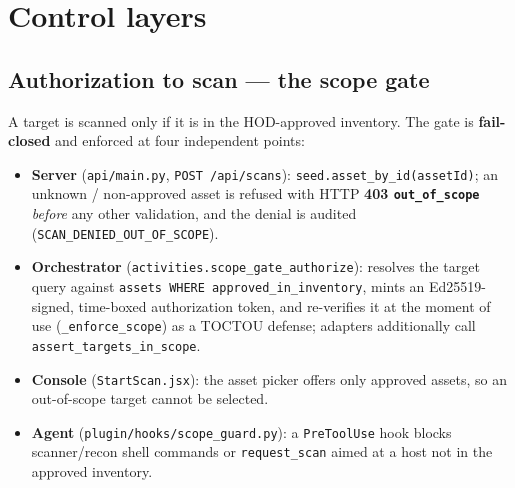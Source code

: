 \documentclass[11pt,a4paper]{article}
\newcommand{\code}[1]{\texttt{#1}}
\newcommand{\boundary}[1]{\textcolor{NavyBlue!80!black}{\textbf{#1}}}
\begin{document}
\section{Control layers}

\subsection{Authorization to scan --- the scope gate}
A target is scanned only if it is in the HOD-approved inventory. The gate is
\textbf{fail-closed} and enforced at four independent points:
\begin{itemize}
  \item \boundary{Server} (\code{api/main.py}, \code{POST /api/scans}):
        \code{seed.asset\_by\_id(assetId)}; an unknown / non-approved asset is
        refused with HTTP \textbf{403 \code{out\_of\_scope}} \emph{before} any
        other validation, and the denial is audited
        (\code{SCAN\_DENIED\_OUT\_OF\_SCOPE}).
  \item \boundary{Orchestrator} (\code{activities.scope\_gate\_authorize}):
        resolves the target query against \code{assets WHERE
        approved\_in\_inventory}, mints an Ed25519-signed, time-boxed
        authorization token, and re-verifies it at the moment of use
        (\code{\_enforce\_scope}) as a TOCTOU defense; adapters additionally call
        \code{assert\_targets\_in\_scope}.
  \item \boundary{Console} (\code{StartScan.jsx}): the asset picker offers only
        approved assets, so an out-of-scope target cannot be selected.
  \item \boundary{Agent} (\code{plugin/hooks/scope\_guard.py}): a
        \code{PreToolUse} hook blocks scanner/recon shell commands or
        \code{request\_scan} aimed at a host not in the approved inventory.
\end{itemize}
\end{document}
